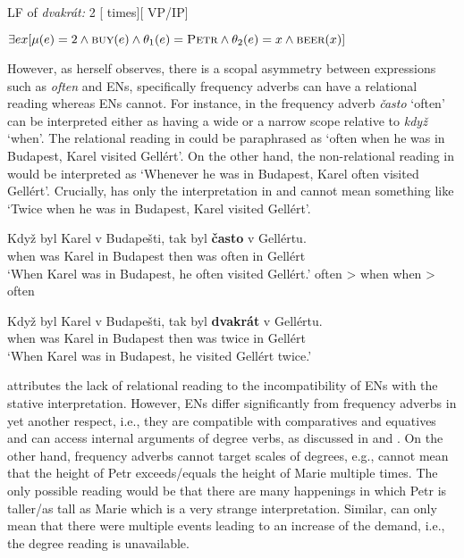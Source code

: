 \documentclass[output=paper,
modfonts,
hidelinks,
newtxmath
]{langscibook}
\begin{document}
\ea\label{dvakrat-LF} LF of \textit{dvakrát:} 2 [ times][ VP/IP]
\z

\ea\label{dvakrat-interpretation} $\exists ex[\mu(e)=2 \wedge \textsc{buy}(e) \wedge \theta_1(e)=\textsc{Petr} \wedge \theta_2(e)=x \wedge \textsc{beer}(x)]$
\z 

\noindent However, as \cite{doetjes_adverbs_2007} herself observes, there is a scopal asymmetry between expressions such as \textit{often} and ENs, specifically frequency adverbs can have a relational reading whereas ENs cannot. For instance, in  the frequency adverb \textit{často} `often' can be interpreted either as having a wide or a narrow scope relative to \textit{když} `when'. The relational reading in  could be paraphrased as `often when he was in Budapest, Karel visited Gellért'. On the other hand, the non-relational reading in  would be interpreted as `Whenever he was in Budapest, Karel often visited Gellért'. Crucially,  has only the interpretation in  and cannot mean something like `Twice when he was in Budapest, Karel visited Gellért'.

\ea\label{casto-(non)relational-reading} \gll Když byl Karel v Budapešti, tak byl \textbf{často} v Gellértu.\\
when was Karel in Budapest then was often in Gellért\\
\glt `When Karel was in Budapest, he often visited Gellért.'
\ea often \textgreater{} when\label{casto-relational-reading}
\ex when \textgreater{} often\label{casto-non-relational-reading}
\z \z

\ea\label{dvakrat-(non)relational-reading} \gll Když byl Karel v Budapešti, tak byl \textbf{dvakrát} v Gellértu.\\
when was Karel in Budapest then was twice in Gellért\\
\glt `When Karel was in Budapest, he visited Gellért twice.'
\z \z

\noindent \cite{doetjes_adverbs_2007} attributes the lack of relational reading to the incompatibility of ENs with the stative interpretation. However, ENs differ significantly from frequency adverbs in yet another respect, i.e., they are compatible with comparatives and equatives and can access internal arguments of degree verbs, as discussed in  and . On the other hand, frequency adverbs cannot target scales of degrees, e.g.,  cannot mean that the height of Petr exceeds/equals the height of Marie multiple times. The only possible reading would be that there are many happenings in which Petr is taller/as tall as Marie which is a very strange interpretation. Similar,  can only mean that there were multiple events leading to an increase of the demand, i.e., the degree reading is unavailable.
\end{document}
